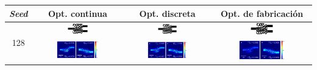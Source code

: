 \begin{landscape}
\begin{table}[ht]
    \centering
    \vspace*{-2.5cm}
    \hspace*{-5cm}
    \begin{tabular}{|c|c|c|c|}
    \hline 
    \emph{Seed} & Opt. continua & Opt. discreta &  Opt. de fabricación \\
    \hline
      \multirow{2}{*}{128} &
      \includegraphics[width=0.24\textwidth]{image/results/wdm/L-BFGS-B/visualize_eps_cont_128.png} &
      \includegraphics[width=0.24\textwidth]{image/results/wdm/L-BFGS-B/visualize_eps_disc_128.png} &
      \includegraphics[width=0.24\textwidth]{image/results/wdm/L-BFGS-B/visualize_eps_fab_128.png} \\
      \cline{2-4}
      &
      \includegraphics[width=0.50\textwidth]{image/results/wdm/L-BFGS-B/visualize_field_cont_128.png} &
      \includegraphics[width=0.50\textwidth]{image/results/wdm/L-BFGS-B/visualize_field_disc_128.png} &
      \includegraphics[width=0.50\textwidth]{image/results/wdm/L-BFGS-B/visualize_field_fab_128.png} \\

\end{tabular}
\end{table}
\end{landscape}
